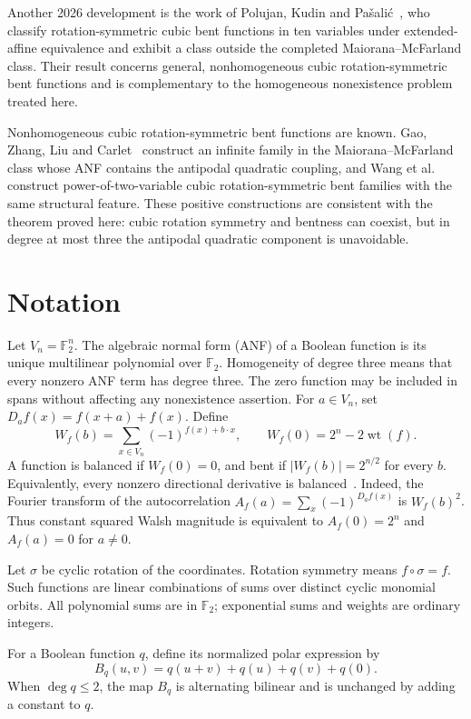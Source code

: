 \documentclass[11pt,a4paper]{article}
\theoremstyle{remark}
\theoremstyle{plain}
\newcommand{\F}{\mathbb F_2}
\newcommand{\wt}{\operatorname{wt}}
\begin{document}
Another 2026 development is the work of Polujan, Kudin and Pa\v{s}ali\'c~\cite{polujan2026}, who classify rotation-symmetric cubic bent functions in ten variables under extended-affine equivalence and exhibit a class outside the completed Maiorana--McFarland class. Their result concerns general, nonhomogeneous cubic rotation-symmetric bent functions and is complementary to the homogeneous nonexistence problem treated here.

Nonhomogeneous cubic rotation-symmetric bent functions are known. Gao, Zhang, Liu and Carlet~\cite{gao2012} construct an infinite family in the Maiorana--McFarland class whose ANF contains the antipodal quadratic coupling, and Wang et al.~\cite{wang2015} construct power-of-two-variable cubic rotation-symmetric bent families with the same structural feature. These positive constructions are consistent with the theorem proved here: cubic rotation symmetry and bentness can coexist, but in degree at most three the antipodal quadratic component is unavoidable.

\section{Notation}
Let $V_n=\F^n$. The algebraic normal form (ANF) of a Boolean function is its unique multilinear polynomial over $\F$. Homogeneity of degree three means that every nonzero ANF term has degree three. The zero function may be included in spans without affecting any nonexistence assertion.
For $a\in V_n$, set $D_a f(x)=f(x+a)+f(x)$. Define
\[
 W_f(b)=\sum_{x\in V_n}(-1)^{f(x)+b\cdot x},\qquad
 W_f(0)=2^n-2\wt(f).
\]
A function is balanced if $W_f(0)=0$, and bent if $|W_f(b)|=2^{n/2}$ for every $b$. Equivalently, every nonzero directional derivative is balanced~\cite{rothaus,meier1989}. Indeed, the Fourier transform of the autocorrelation $A_f(a)=\sum_x(-1)^{D_af(x)}$ is $W_f(b)^2$. Thus constant squared Walsh magnitude is equivalent to $A_f(0)=2^n$ and $A_f(a)=0$ for $a\ne0$.

Let $\sigma$ be cyclic rotation of the coordinates. Rotation symmetry means $f\circ\sigma=f$. Such functions are linear combinations of sums over distinct cyclic monomial orbits. All polynomial sums are in $\F$; exponential sums and weights are ordinary integers.

For a Boolean function $q$, define its normalized polar expression by
\[
B_q(u,v)=q(u+v)+q(u)+q(v)+q(0).
\]
When $\deg q\le2$, the map $B_q$ is alternating bilinear and is unchanged by adding a constant to $q$.
\end{document}

